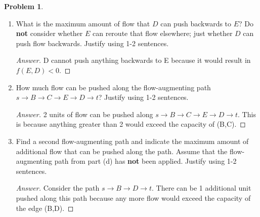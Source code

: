 \documentclass[11pt]{article}
\theoremstyle{definition}
\theoremstyle{definition}
\newtheorem{required}{Problem}
\theoremstyle{definition}
\begin{document}
\begin{required}
\begin{enumerate}[label=(\alph*)]
\vskip 10pt
\item What is the maximum amount of flow that $D$ can push backwards to $E$? Do \textbf{not} consider whether $E$ can reroute that flow elsewhere; just whether $D$ can push flow backwards. Justify using 1-2 sentences.

\begin{proof}[Answer]
D cannot push anything backwards to E because it would result in $f(E,D) < 0$. 
\end{proof}


\vskip 10pt
\item How much flow can be pushed along the flow-augmenting path $s \to B \to C \to E \to D \to t$? Justify using 1-2 sentences.

\begin{proof}[Answer]
2 units of flow can be pushed along $s \to B \to C \to E \to D \to t$. This is because anything greater than 2 would exceed the capacity of (B,C). 
\end{proof}


\vskip 10pt
\item Find a second flow-augmenting path and indicate the maximum amount of additional flow that can be pushed along the path. Assume that the flow-augmenting path from part (d) has \textbf{not} been applied. Justify using 1-2 sentences.

\begin{proof}[Answer]
Consider the path $s \to B \to D \to t$. There can be 1 additional unit pushed along this path because any more flow would exceed the capacity of the edge (B,D). 
\end{proof}
\end{enumerate}
\end{required}





\end{document}
